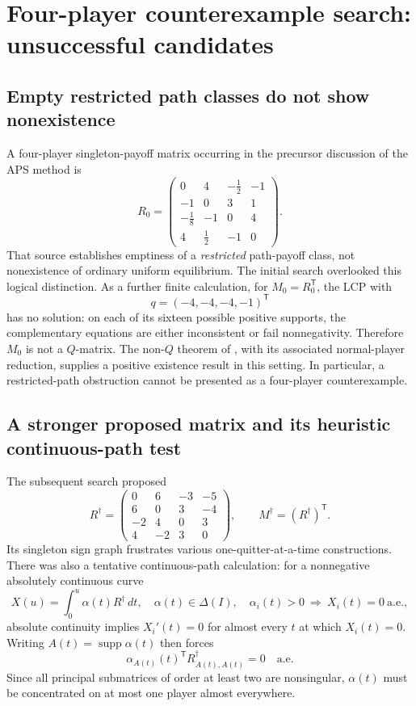 \documentclass[11pt,a4paper]{article}
\theoremstyle{definition}
\theoremstyle{remark}
\newcommand{\supp}{\operatorname{supp}}
\begin{document}
\section{Four-player counterexample search: unsuccessful candidates}\label{sec:search}
\subsection{Empty restricted path classes do not show nonexistence}
A four-player singleton-payoff matrix occurring in the precursor discussion of the APS method \cite[Example~3.5]{apslecture} is
\begin{equation}\label{eq:Rzero}
R_0=\begin{pmatrix}
0&4&-\frac12&-1\\
-1&0&3&1\\
-\frac18&-1&0&4\\
4&\frac12&-1&0
\end{pmatrix}.
\end{equation}
That source establishes emptiness of a \emph{restricted} path-payoff class, not nonexistence of ordinary uniform equilibrium. The initial search overlooked this logical distinction. As a further finite calculation, for $M_0=R_0^{\mathsf T}$, the LCP with
\[
q=(-4,-4,-4,-1)^{\mathsf T}
\]
has no solution: on each of its sixteen possible positive supports, the complementary equations are either inconsistent or fail nonnegativity. Therefore $M_0$ is not a $Q$-matrix. The non-$Q$ theorem of \cite{solansolan2020}, with its associated normal-player reduction, supplies a positive existence result in this setting. In particular, a restricted-path obstruction cannot be presented as a four-player counterexample.

\subsection{A stronger proposed matrix and its heuristic continuous-path test}
The subsequent search proposed
\begin{equation}\label{eq:Rdag}
R^\dagger=\begin{pmatrix}
0&6&-3&-5\\
6&0&3&-4\\
-2&4&0&3\\
4&-2&3&0
\end{pmatrix},\qquad M^\dagger=(R^\dagger)^{\mathsf T}.
\end{equation}
Its singleton sign graph frustrates various one-quitter-at-a-time constructions. There was also a tentative continuous-path calculation: for a nonnegative absolutely continuous curve
\[
X(u)=\int_0^u\alpha(t)R^\dagger\,dt,
\quad \alpha(t)\in\Delta(I),
\quad \alpha_i(t)>0\ \Longrightarrow\ X_i(t)=0\ \text{a.e.},
\]
absolute continuity implies $X_i'(t)=0$ for almost every $t$ at which $X_i(t)=0$. Writing $A(t)=\supp\alpha(t)$ then forces
\[
\alpha_{A(t)}(t)^{\mathsf T}R^\dagger_{A(t),A(t)}=0\quad\text{a.e.}
\]
Since all principal submatrices of order at least two are nonsingular, $\alpha(t)$ must be concentrated on at most one player almost everywhere.
\end{document}
